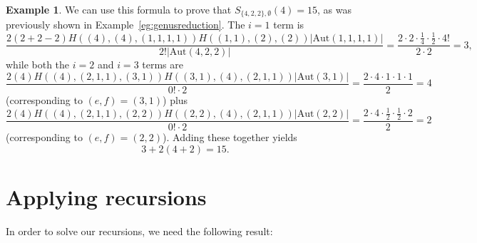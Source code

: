 \documentclass[thesis]{thesis-umich}           %
\newcommand{\Aut}{\text{Aut}}
\theoremstyle{definition}
\newtheorem{eg}[thm]{Example}
\begin{document}
\begin{eg}
  We can use this formula to prove that $S_{\{4,2,2\},\emptyset}(4)=15$, as was previously shown in
  Example~\ref{eg:genusreduction}.
  The $i=1$ term is
  \[
  \frac{2(2+2-2)H((4),(4),(1,1,1,1))H((1,1),(2),(2))|\Aut(1,1,1,1)|}{2!|\Aut(4,2,2)|} =\frac{2\cdot 2\cdot \frac 14\cdot \frac 12\cdot 4!}{2\cdot 2}=3,
  \]
  while both the $i=2$ and $i=3$ terms are
  \[
  \frac{2(4)H((4),(2,1,1),(3,1))H((3,1),(4),(2,1,1))|\Aut(3,1)|}{0!\cdot 2}=\frac{2\cdot 4\cdot 1\cdot 1\cdot 1}{2}=4
  \]
  (corresponding to $(e,f)=(3,1)$) plus
  \[
  \frac{2(4)H((4),(2,1,1),(2,2))H((2,2),(4),(2,1,1))|\Aut(2,2)|}{0!\cdot 2}=\frac{2\cdot 4\cdot \frac 12\cdot \frac 12\cdot 2}{2}=2
  \]
  (corresponding to $(e,f)=(2,2)$). Adding these together yields
  \[
  3+2(4+2)=15.
  \]
  \end{eg}

\section{Applying recursions}

In order to solve our recursions, we need the following result:
\end{document}
